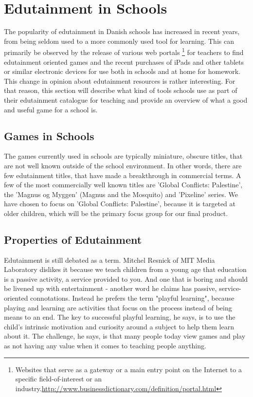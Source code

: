 \section{Edutainment in Schools}
\label{sec:eduinsch}
The popularity of edutainment in Danish schools has increased in recent years, from being seldom used to a more commonly used tool for learning. 
This can primarily be observed by the release of various web portals \footnote{Websites that serve as a gateway or a main entry point on the Internet to a specific field-of-interest or an industry.\url{http://www.businessdictionary.com/definition/portal.html}} for teachers to find edutainment oriented games and the recent purchases of iPads and other tablets or similar electronic devices for use both in schools and at home for homework.
This change in opinion about edutainment resources is rather interesting. For that reason, this section will describe what kind of tools schools use as part of their edutainment catalogue for teaching and provide an overview of what a good and useful game for a school is.


\subsection{Games in Schools}

The games currently used in schools are typically miniature, obscure titles, that are not well known outside of the school environment.
In other words, there are few edutainment titles, that have made a breakthrough in commercial terms.
A few of the most commercially well known titles are 'Global Conflicts: Palestine', the 'Magnus og Myggen' (Magnus and the Mosquito) and 'Pixeline' series.
We have chosen to focus on 'Global Conflicts: Palestine', because it is targeted at older children, which will be the primary focus group for our final product.

\subsection{Properties of Edutainment}

Edutainment is still debated as a term. Mitchel Resnick of MIT Media Laboratory dislikes it because we teach children from a young age that education is a passive activity, a service provided to you. And one that is boring and should be livened up with entertainment - another word he claims has passive, service-oriented connotations. Instead he prefers the term "playful learning", because playing and learning are activities that focus on the process instead of being means to an end. The key to successful playful learning, he says, is to use the child's intrinsic motivation and curiosity around a subject to help them learn about it. The challenge, he says, is that many people today view games and play as not having any value when it comes to teaching people anything. 

